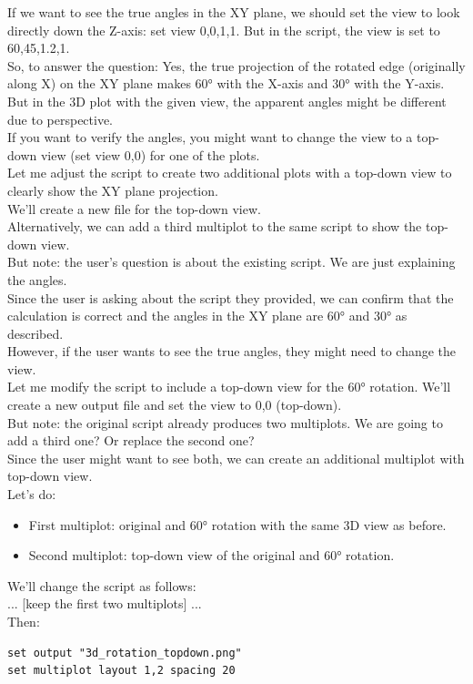\documentclass[a4paper,10pt]{article}
\begin{document}
\begin{enumerate}
If we want to see the true angles in the XY plane, we should set the view to look directly down the Z-axis: set view 0,0,1,1. But in the script, the view is set to 60,45,1.2,1.\\
So, to answer the question: Yes, the true projection of the rotated edge (originally along X) on the XY plane makes 60° with the X-axis and 30° with the Y-axis. But in the 3D plot with the given view, the apparent angles might be different due to perspective.\\
If you want to verify the angles, you might want to change the view to a top-down view (set view 0,0) for one of the plots.\\
Let me adjust the script to create two additional plots with a top-down view to clearly show the XY plane projection.\\
We'll create a new file for the top-down view.\\
Alternatively, we can add a third multiplot to the same script to show the top-down view.\\
But note: the user's question is about the existing script. We are just explaining the angles.\\
Since the user is asking about the script they provided, we can confirm that the calculation is correct and the angles in the XY plane are 60° and 30° as described.\\
However, if the user wants to see the true angles, they might need to change the view.\\
Let me modify the script to include a top-down view for the 60° rotation.
We'll create a new output file and set the view to 0,0 (top-down).\\
But note: the original script already produces two multiplots. We are going to add a third one? Or replace the second one?\\
Since the user might want to see both, we can create an additional multiplot with top-down view.\\
Let's do:
\begin{itemize}
\item First multiplot: original and 60° rotation with the same 3D view as before.
\item Second multiplot: top-down view of the original and 60° rotation.
\end{itemize}
 We'll change the script as follows:\\
 ... [keep the first two multiplots] ...\\
 Then:
\begin{verbatim}
set output "3d_rotation_topdown.png"
set multiplot layout 1,2 spacing 20


\end{verbatim}
\end{enumerate}
\end{document}
